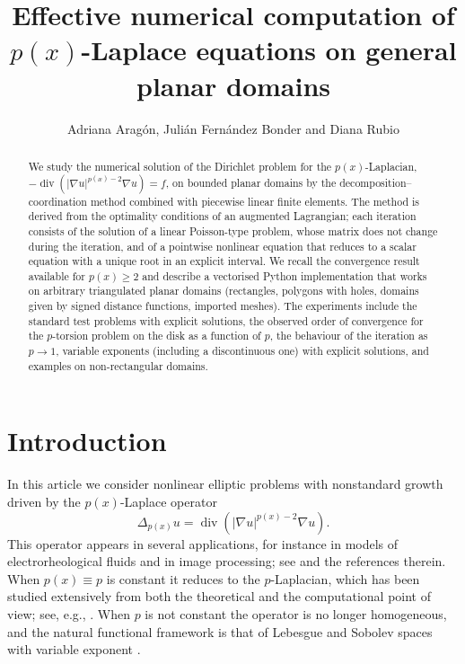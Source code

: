 \documentclass[11pt]{amsart}
\title[Numerical computation of \texorpdfstring{$p(x)$}{p(x)}-Laplace equations]{Effective numerical computation of $p(x)$-Laplace equations on general planar domains}
\author[A. Arag\'on, J. Fern\'andez Bonder and D. Rubio]
{Adriana Arag\'on, Juli\'an Fern\'andez Bonder and Diana Rubio}
\DeclareMathOperator{\dvg}{div}
\theoremstyle{definition}
\theoremstyle{remark}
\numberwithin{equation}{section}
\begin{document}
\begin{abstract}
We study the numerical solution of the Dirichlet problem for the $p(x)$-Laplacian, $-\dvg(|\nabla u|^{p(x)-2}\nabla u)=f$, on bounded planar domains by the decomposition--coordination method combined with piecewise linear finite elements. The method is derived from the optimality conditions of an augmented Lagrangian; each iteration consists of the solution of a linear Poisson-type problem, whose matrix does not change during the iteration, and of a pointwise nonlinear equation that reduces to a scalar equation with a unique root in an explicit interval. We recall the convergence result available for $p(x)\ge 2$ and describe a vectorised Python implementation that works on arbitrary triangulated planar domains (rectangles, polygons with holes, domains given by signed distance functions, imported meshes). The experiments include the standard test problems with explicit solutions, the observed order of convergence for the $p$-torsion problem on the disk as a function of $p$, the behaviour of the iteration as $p\to 1$, variable exponents (including a discontinuous one) with explicit solutions, and examples on non-rectangular domains.
\end{abstract}

\maketitle

\section{Introduction}

In this article we consider nonlinear elliptic problems with nonstandard growth driven by the $p(x)$-Laplace operator
$$
\Delta_{p(x)} u = \dvg\left( |\nabla u|^{p(x)-2}\nabla u\right).
$$
This operator appears in several applications, for instance in models of electrorheological fluids and in image processing; see \cite{CLR, R} and the references therein. When $p(x)\equiv p$ is constant it reduces to the $p$-Laplacian, which has been studied extensively from both the theoretical and the computational point of view; see, e.g., \cite{BL}. When $p$ is not constant the operator is no longer homogeneous, and the natural functional framework is that of Lebesgue and Sobolev spaces with variable exponent \cite{DHHR}.
\end{document}
